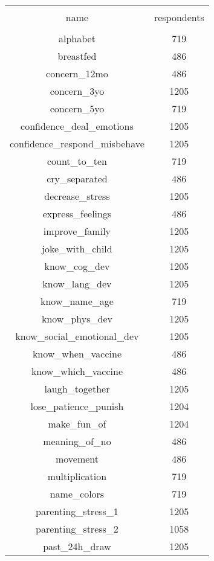 
\begin{table}[!htbp] \centering 
  \caption{} 
  \label{tbl:respondents} 
\begin{tabular}{@{\extracolsep{5pt}} cc} 
\\[-1.8ex]\hline 
\hline \\[-1.8ex] 
name & respondents \\ 
\hline \\[-1.8ex] 
alphabet &  719 \\ 
breastfed &  486 \\ 
concern\_12mo &  486 \\ 
concern\_3yo & 1205 \\ 
concern\_5yo &  719 \\ 
confidence\_deal\_emotions & 1205 \\ 
confidence\_respond\_misbehave & 1205 \\ 
count\_to\_ten &  719 \\ 
cry\_separated &  486 \\ 
decrease\_stress & 1205 \\ 
express\_feelings &  486 \\ 
improve\_family & 1205 \\ 
joke\_with\_child & 1205 \\ 
know\_cog\_dev & 1205 \\ 
know\_lang\_dev & 1205 \\ 
know\_name\_age &  719 \\ 
know\_phys\_dev & 1205 \\ 
know\_social\_emotional\_dev & 1205 \\ 
know\_when\_vaccine &  486 \\ 
know\_which\_vaccine &  486 \\ 
laugh\_together & 1205 \\ 
lose\_patience\_punish & 1204 \\ 
make\_fun\_of & 1204 \\ 
meaning\_of\_no &  486 \\ 
movement &  486 \\ 
multiplication &  719 \\ 
name\_colors &  719 \\ 
parenting\_stress\_1 & 1205 \\ 
parenting\_stress\_2 & 1058 \\ 
past\_24h\_draw & 1205 \\ 

\end{tabular}
\end{table}
